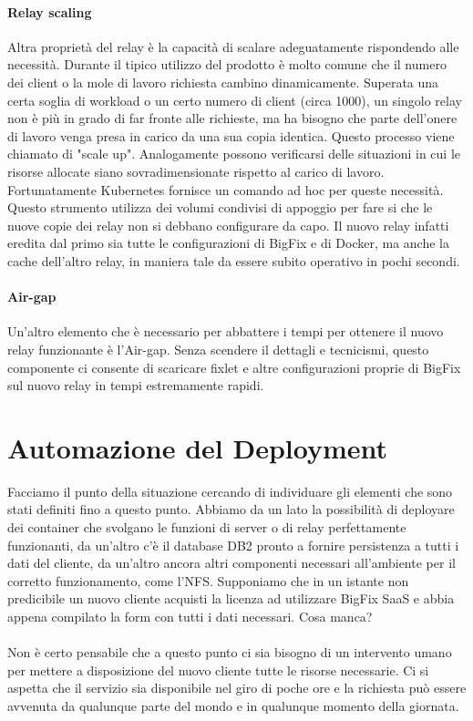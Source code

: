 \paragraph{Relay scaling}
Altra proprietà del relay è la capacità di scalare adeguatamente rispondendo alle necessità. Durante il tipico utilizzo del prodotto è molto comune che il numero dei client o la mole di lavoro richiesta cambino dinamicamente. Superata una certa soglia di workload o un certo numero di client (circa 1000), un singolo relay non è più in grado di far fronte alle richieste, ma ha bisogno che parte dell'onere di lavoro venga presa in carico da una sua copia identica. Questo processo viene chiamato di "scale up". Analogamente possono verificarsi delle situazioni in cui le risorse allocate siano sovradimensionate rispetto al carico di lavoro. Fortunatamente Kubernetes fornisce un comando ad hoc per queste necessità. Questo strumento utilizza dei volumi condivisi di appoggio per fare si che le nuove copie dei relay non si debbano configurare da capo. Il nuovo relay infatti eredita dal primo sia tutte le configurazioni di BigFix e di Docker, ma anche la cache dell'altro relay, in maniera tale da essere subito operativo in pochi secondi. 
\paragraph{Air-gap}
Un'altro elemento che è necessario per abbattere i tempi per ottenere il nuovo relay funzionante è l'Air-gap. Senza scendere il dettagli e tecnicismi, questo componente ci consente di scaricare fixlet e altre configurazioni proprie di BigFix sul nuovo relay in tempi estremamente rapidi. 
\section{Automazione del Deployment}
Facciamo il punto della situazione cercando di individuare gli elementi che sono stati definiti fino a questo punto. Abbiamo da un lato la possibilità di deployare dei container che svolgano le funzioni di server o di relay perfettamente funzionanti, da un'altro c'è il database DB2 pronto a fornire persistenza a tutti i dati del cliente, da un'altro ancora altri componenti necessari all'ambiente per il corretto funzionamento, come l'NFS. Supponiamo che in un istante non predicibile un nuovo cliente acquisti la licenza ad utilizzare BigFix SaaS e abbia appena compilato la form con tutti i dati necessari. Cosa manca? 
\paragraph{}
Non è certo pensabile che a questo punto ci sia bisogno di un intervento umano per mettere a disposizione del nuovo cliente tutte le risorse necessarie. Ci si aspetta che il servizio sia disponibile nel giro di poche ore e la richiesta può essere avvenuta da qualunque parte del mondo e in qualunque momento della giornata.
